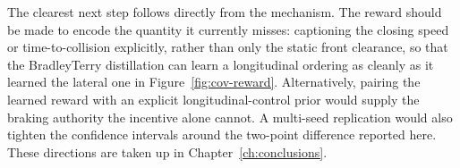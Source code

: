 The clearest next step follows directly from the mechanism. The reward should be made to encode
the quantity it currently misses: captioning the closing speed or time-to-collision explicitly,
rather than only the static front clearance, so that the Bradley\textendash Terry distillation
can learn a longitudinal ordering as cleanly as it learned the lateral one in
Figure~\ref{fig:cov-reward}. Alternatively, pairing the learned reward with an explicit
longitudinal-control prior would supply the braking authority the incentive alone cannot. A
multi-seed replication would also tighten the confidence intervals around the two-point
difference reported here. These directions are taken up in Chapter~\ref{ch:conclusions}.

\clearpage
